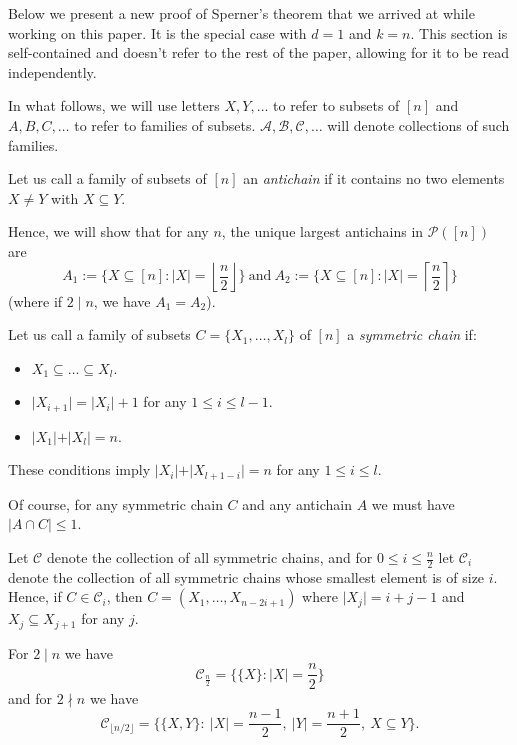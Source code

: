 \documentclass[11pt, reqno]{amsart}
\newcommand{\leanblueprintbase}{https://mj141592.github.io/weighted-chains-paper}
\newif\ifleanlinks
\newcommand{\leanblueprint}[1]{%
  \ifleanlinks
    \leavevmode\unskip\penalty9999\hbox{}\nobreak\hfill\quad
    \href{\leanblueprintbase/theorems/#1/}{%
      \mbox{\normalfont\footnotesize\textcolor{blue}{[\textsf{Lean formalisation}]}}}%
    \par\nobreak
  \fi
}
\theoremstyle{remark}
\numberwithin{equation}{section}
\begin{document}
Below we present a new proof of Sperner's theorem that we arrived at while working on this paper. It is the special case with $d=1$ and $k=n$. This section is self-contained and doesn't refer to the rest of the paper, allowing for it to be read independently.

In what follows, we will use letters $X, Y, \ldots$ to refer to subsets of $[n]$ and $A, B, C, \ldots$ to refer to families of subsets. $\mathcal{A}, \mathcal{B}, \mathcal{C}, \ldots$ will denote collections of such families.

Let us call a family of subsets of $[n]$ an \emph{antichain} if it contains no two elements $X \neq Y$ with $X \subseteq Y$.

Hence, we will show that for any $n$, the unique largest antichains in $\mathcal{P}([n])$ are
\begin{equation*}
    A_1 := \big\{X \subseteq [n]: \vert X\vert  = \left\lfloor\frac{n}{2}\right\rfloor\big\}
    \ \text{and} \
    A_2 := \big\{X \subseteq [n]: \vert X\vert  = \left\lceil\frac{n}{2}\right\rceil\big\}
\end{equation*}
(where if $2 \mid n$, we have $A_1=A_2$).
\leanblueprint{sperner-appendix}

Let us call a family of subsets $C = \{X_1, \ldots, X_l\}$ of $[n]$ a \emph{symmetric chain} if:
\begin{itemize}
    \item $X_1 \subseteq \ldots \subseteq X_l$.
    \item $\vert X_{i+1}\vert =\vert X_i\vert +1$ for any $1 \leqslant i \leqslant l-1$.
    \item $\vert X_1\vert +\vert X_l\vert =n$.
\end{itemize}
These conditions imply $\vert X_i\vert +\vert X_{l+1-i}\vert =n$ for any $1 \leqslant i \leqslant l$.

Of course, for any symmetric chain $C$ and any antichain $A$ we must have $\vert A \cap C \vert \leqslant 1$.

Let $\mathcal{C}$ denote the collection of all symmetric chains, and for $0 \leqslant i \leqslant \frac{n}{2}$ let $\mathcal{C}_i$ denote the collection of all symmetric chains whose smallest element is of size $i$. Hence, if $C \in \mathcal{C}_i$, then $C = (X_1, \ldots, X_{n-2i+1})$ where $\vert X_j\vert =i+j-1$ and $X_j \subseteq X_{j+1}$ for any $j$.

For $2 \mid n$ we have
\begin{equation}
\label{n_even_cn2_equation}
    \mathcal{C}_{\frac{n}{2}} = \big\{\{X\}: \vert X\vert =\frac{n}{2}\big\}
\end{equation}
and for $2 \nmid n$ we have
\begin{equation}
\label{n_odd_cn2_equation}
    \mathcal{C}_{\lfloor n/2 \rfloor} = \big\{ \{X, Y\} : \ \vert X\vert  = \frac{n-1}{2}, \ \vert Y\vert =\frac{n+1}{2}, \ X \subseteq Y \big\}.
\end{equation}
\end{document}
